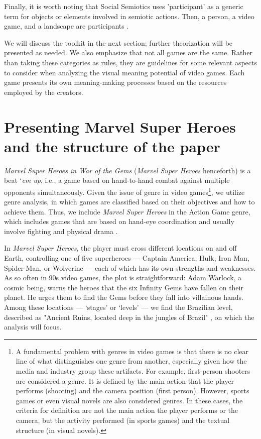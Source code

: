 \documentclass[english]{textolivre}
\begin{document}
Finally, it is worth noting that Social Semiotics uses 'participant' as a generic term for objects or elements involved in semiotic actions. Then, a person, a video game, and a landscape are participants \cites[p. 45, 113-5]{kress_reading_2020}.

We will discuss the toolkit in the next section; further theorization will be presented as needed. We also emphasize that not all games are the same. Rather than taking these categories as rules, they are guidelines for some relevant aspects to consider when analyzing the visual meaning potential of video games. Each game presents its own meaning-making processes based on the resources employed by the creators.


\section{Presenting Marvel Super Heroes and the structure of the paper}\label{sec-fmt-manuscrito}
\textit{Marvel Super Heroes in War of the Gems} \cite{capcom_marvel_1996} (\textit{Marvel Super Heroes} henceforth) is a beat ‘\textit{em up}, i.e., a game based on hand-to-hand combat against multiple opponents simultaneously. Given the issue of genre in video games\footnote{A fundamental problem with genres in video games is that there is no clear line of what distinguishes one genre from another, especially given how the media and industry group these artifacts. For example, first-person shooters are considered a genre. It is defined by the main action that the player performs (shooting) and the camera position (first person). However, sports games or even visual novels are also considered genres. In these cases, the criteria for definition are not the main action the player performs or the camera, but the activity performed (in sports games) and the textual structure (in visual novels).}, we utilize \textcite[p. 52]{egenfeldt-nielsen_understanding_2016} genre analysis, in which games are classified based on their objectives and how to achieve them. Thus, we include \textit{Marvel Super Heroes} in the Action Game genre, which includes games that are based on hand-eye coordination and usually involve fighting and physical drama \cite[p. 56-6]{egenfeldt-nielsen_understanding_2016}.

In \textit{Marvel Super Heroes}, the player must cross different locations on and off Earth, controlling one of five superheroes — Captain America, Hulk, Iron Man, Spider-Man, or Wolverine — each of which has its own strengths and weaknesses. As so often in 90s video games, the plot is straightforward: Adam Warlock, a cosmic being, warns the heroes that the six Infinity Gems have fallen on their planet. He urges them to find the Gems before they fall into villainous hands. Among these locations — ‘stages’ or ‘levels’ — we find the Brazilian level, described as "Ancient Ruins, located deep in the jungles of Brazil" \cite{capcom_marvel_1996}, on which the analysis will focus.
\end{document}
